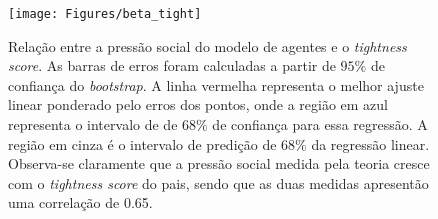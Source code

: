 \begin{figure}
\begin{center}
\texttt{[image: Figures/beta\_tight]}
\end{center}
\caption{Relação entre a pressão social do modelo de agentes e o \textit{tightness
score}. As barras de erros foram calculadas a partir de $95\%$ de confiança do
\textit{bootstrap}. A linha vermelha representa o melhor ajuste linear
ponderado pelo erros dos pontos, onde a região em azul representa o intervalo de
de $68\%$ de confiança para essa regressão. A região em cinza é o intervalo de
predição de $68\%$ da regressão linear. Observa-se claramente que a pressão
social medida pela teoria cresce com o \textit{tightness score} do pais, sendo
que as duas medidas apresentão uma correlação de 0.65.}
\label{fig:}
\end{figure}

